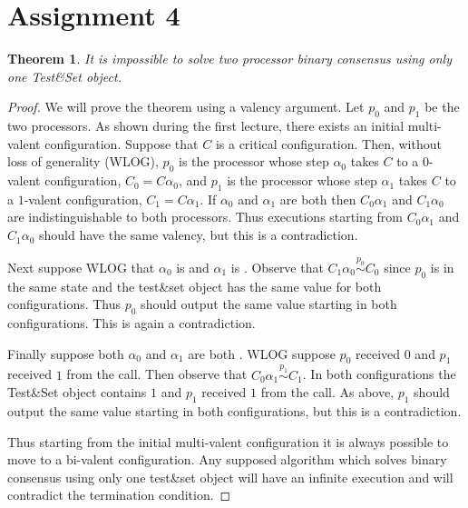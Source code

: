 \documentclass[11pt]{article}
\newcommand\tns{\textproc{test\&set }}
\newcommand\resetF{\textproc{reset }}
\newtheorem{theorem}{Theorem}
\begin{document}
\rhead{\today}

\section*{Assignment 4}
\begin{theorem}
It is impossible to solve two processor binary consensus using only one Test\&Set object.
\end{theorem}
\begin{proof}
We will prove the theorem using a valency argument. Let $p_0$ and $p_1$ be the two processors. As shown during the first lecture, there exists an initial multi-valent configuration. Suppose that $C$ is a critical configuration. Then, without loss of generality (WLOG), $p_0$ is the processor whose step $\alpha_0$ takes $C$ to a $0$-valent configuration, $C_0 = C\alpha_0$, and $p_1$ is the processor whose step $\alpha_1$ takes $C$ to a $1$-valent configuration, $C_1 = C\alpha_1$. If $\alpha_0$ and $\alpha_1$ are both \resetF then $C_0\alpha_1$ and $C_1\alpha_0$ are indistinguishable to both processors. Thus executions starting from $C_0\alpha_1$ and $C_1\alpha_0$ should have the same valency, but this is a contradiction.

Next suppose WLOG that $\alpha_0$ is \resetF and $\alpha_1$ is . Observe that $C_1\alpha_0 \stackrel{p_0}{\sim} C_0$ since $p_0$ is in the same state and the test\&set object has the same value for both configurations. Thus $p_0$ should output the same value starting in both configurations. This is again a contradiction.

Finally suppose both $\alpha_0$ and $\alpha_1$ are both . WLOG suppose $p_0$ received $0$ and $p_1$ received $1$ from the \tns call. Then observe that $C_0\alpha_1 \stackrel{p_1}{\sim} C_1$. In both configurations the Test\&Set object contains $1$ and $p_1$ received $1$ from the \tns call. As above, $p_1$ should output the same value starting in both configurations, but this is a contradiction.

Thus starting from the initial multi-valent configuration it is always possible to move to a bi-valent configuration. Any supposed algorithm which solves binary consensus using only one test\&set object will have an infinite execution and will contradict the termination condition. 
\end{proof}
\end{document}
